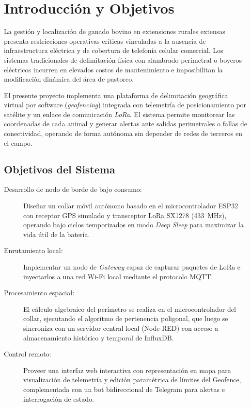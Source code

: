 \section{Introducción y Objetivos}

La gestión y localización de ganado bovino en extensiones rurales extensas presenta restricciones operativas críticas vinculadas a la ausencia de infraestructura eléctrica y de cobertura de telefonía celular comercial. Los sistemas tradicionales de delimitación física con alambrado perimetral o boyeros eléctricos incurren en elevados costos de mantenimiento e imposibilitan la modificación dinámica del área de pastoreo.

El presente proyecto implementa una plataforma de delimitación geográfica virtual por software (\textit{geofencing}) integrada con telemetría de posicionamiento por satélite y un enlace de comunicación \textit{LoRa}. El sistema permite monitorear las coordenadas de cada animal y generar alertas ante salidas perimetrales o fallas de conectividad, operando de forma autónoma sin depender de redes de terceros en el campo.

\subsection{Objetivos del Sistema}
\begin{description}
    \item[Desarrollo de nodo de borde de bajo consumo:] Diseñar un collar móvil autónomo basado en el microcontrolador ESP32 con receptor GPS simulado y transceptor LoRa SX1278 (433~MHz), operando bajo ciclos temporizados en modo \textit{Deep Sleep} para maximizar la vida útil de la batería.
    \item[Enrutamiento local:] Implementar un nodo de \textit{Gateway} capaz de capturar paquetes de LoRa e inyectarlos a una red Wi-Fi local mediante el protocolo MQTT.
    \item[Procesamiento espacial:] El cálculo algebraico del perímetro se realiza en el microcontrolador del collar, ejecutando el algoritmo de pertenencia poligonal, que luego se sincroniza con un servidor central local (Node-RED) con acceso a almacenamiento histórico y temporal de InfluxDB.
    \item[Control remoto:] Proveer una interfaz web interactiva con representación en mapa para visualización de telemetría y edición paramétrica de límites del Geofence, complementada con un bot bidireccional de Telegram para alertas e interrogación de estado.
\end{description}
